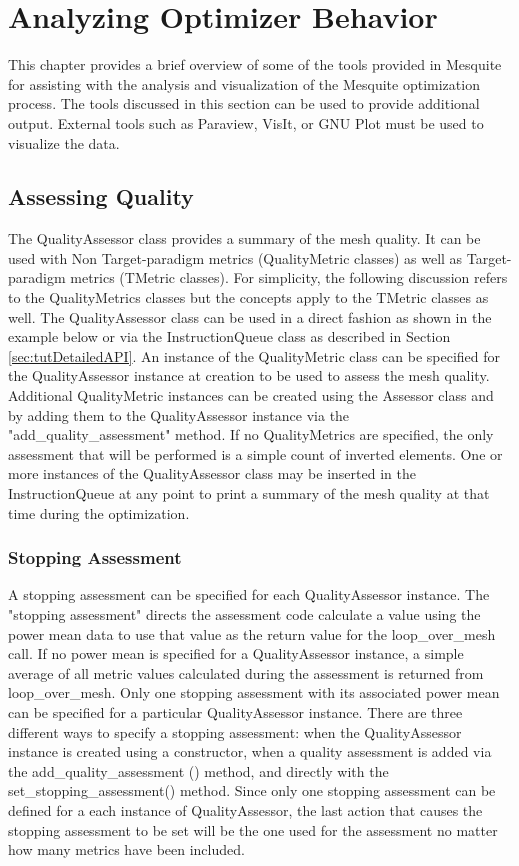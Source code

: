 \chapter{Analyzing Optimizer Behavior}

This chapter provides a brief overview of some of the tools provided in Mesquite for assisting with the analysis and visualization of the Mesquite optimization process.  The tools discussed in this section can be used to provide additional output.	 External tools such as Paraview, VisIt, or GNU Plot must be used to visualize the data.

\section{Assessing Quality}

  The QualityAssessor class provides a summary of the mesh quality. It can be used with Non Target-paradigm metrics (QualityMetric classes) as well as Target-paradigm metrics (TMetric classes). For simplicity, the following discussion refers to the QualityMetrics classes but the concepts apply to the TMetric classes as well.	The QualityAssessor class can be used in a direct fashion as shown in the example below or via the InstructionQueue class as described in Section \ref{sec:tutDetailedAPI}.  An instance of the QualityMetric class can be specified for the QualityAssessor instance at creation to be used to assess the mesh quality.  Additional QualityMetric instances can be created using the Assessor class and by adding them to the QualityAssessor instance via the "add\_quality\_assessment" method. If no QualityMetrics are specified, the only assessment that will be performed is a simple count of inverted elements. One or more instances of the QualityAssessor class may be inserted in the InstructionQueue at any point to print a summary of the mesh quality at that time during the optimization.

\subsection{Stopping Assessment}

A stopping assessment can be specified for each QualityAssessor instance.  The "stopping assessment" directs the assessment code calculate a value using the power mean data to use that value as the return value for the loop\_over\_mesh call.  If no power mean is specified for a QualityAssessor instance, a simple average of all metric values calculated during the assessment is returned from  loop\_over\_mesh.  Only one stopping assessment with its associated power mean can be specified for a particular QualityAssessor instance.  There are three different ways to specify a stopping assessment: when the QualityAssessor instance is created using a constructor, when a quality assessment is added via the add\_quality\_assessment () method, and directly with the set\_stopping\_assessment() method.  Since only one stopping assessment can be defined for a each instance of QualityAssessor, the last action that causes the stopping assessment to be set will be the one used for the assessment no matter how many metrics have been included.


